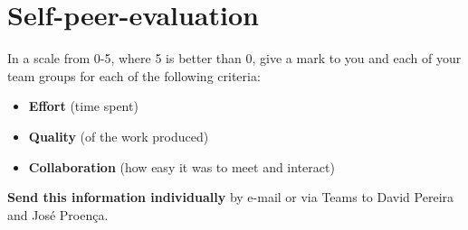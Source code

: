 \documentclass[11pt]{article}
\begin{document}




\section*{Self-peer-evaluation}
\begin{myExercise}
  In a scale from 0-5, where 5 is better than 0, give a mark to you and each of your team groups for each of the following criteria:
  \begin{itemize}
    \item \textbf{Effort} (time spent)
    \item \textbf{Quality} (of the work produced)
    \item \textbf{Collaboration} (how easy it was to meet and interact)
  \end{itemize}
  \textbf{Send this information individually} by e-mail or via Teams to David Pereira and Jos\'{e} Proen\c{c}a.
\end{myExercise}




\end{document}
